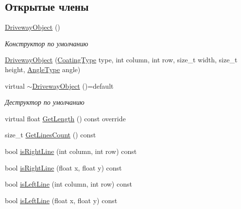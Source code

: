 \subsection*{Открытые члены}
\begin{DoxyCompactItemize}
\item 
\mbox{\label{classrtm_1_1_driveway_object_a0db985799ef0297057c2e33284418a6b}} 
\hyperlink{classrtm_1_1_driveway_object_a0db985799ef0297057c2e33284418a6b}{Driveway\+Object} ()
\begin{DoxyCompactList}\small\item\em Конструктор по умолчанию \end{DoxyCompactList}\item 
\hyperlink{classrtm_1_1_driveway_object_aa9f5531382b6be2c6fb0cde4160a9f90}{Driveway\+Object} (\hyperlink{namespacertm_aecd3929e64cd461eb3555b611f6fad95}{Coating\+Type} type, int column, int row, size\+\_\+t width, size\+\_\+t height, \hyperlink{namespacertm_a69dc82b16a0148c10962caa83d930f89}{Angle\+Type} angle)
\item 
\mbox{\label{classrtm_1_1_driveway_object_a822b655b5c429ce2775a3999f77265a0}} 
virtual \hyperlink{classrtm_1_1_driveway_object_a822b655b5c429ce2775a3999f77265a0}{$\sim$\+Driveway\+Object} ()=default
\begin{DoxyCompactList}\small\item\em Деструктор по умолчанию \end{DoxyCompactList}\item 
virtual float \hyperlink{classrtm_1_1_driveway_object_a5de41ef395ad8ccefb435e568f84ed40}{Get\+Length} () const override
\item 
size\+\_\+t \hyperlink{classrtm_1_1_driveway_object_a239d7f4d9d5203d1f00cf60294e94151}{Get\+Lines\+Count} () const
\item 
bool \hyperlink{classrtm_1_1_driveway_object_ae427989fc802b24d06f6b7f83959be2a}{is\+Right\+Line} (int column, int row) const
\item 
bool \hyperlink{classrtm_1_1_driveway_object_addaa5faebb5469e8074a46f6c3584e56}{is\+Right\+Line} (float x, float y) const
\item 
bool \hyperlink{classrtm_1_1_driveway_object_aea7d711c9cf1ba995bc08d805373cc52}{is\+Left\+Line} (int column, int row) const
\item 
bool \hyperlink{classrtm_1_1_driveway_object_afa48600b7d87a38e6c690e3b1058d177}{is\+Left\+Line} (float x, float y) const
\end{DoxyCompactItemize}
